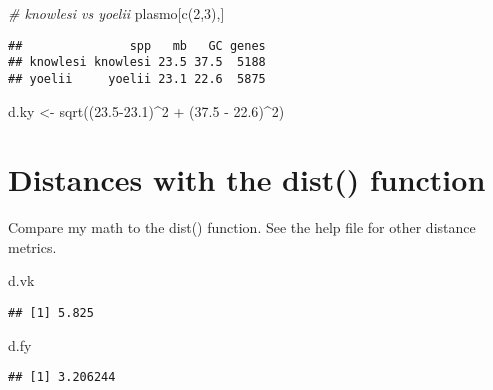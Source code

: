 \documentclass[
]{book}
\newenvironment{Shaded}{\begin{snugshade}}{\end{snugshade}}
\newcommand{\CommentTok}[1]{\textcolor[rgb]{0.56,0.35,0.01}{\textit{#1}}}
\newcommand{\DecValTok}[1]{\textcolor[rgb]{0.00,0.00,0.81}{#1}}
\newcommand{\FloatTok}[1]{\textcolor[rgb]{0.00,0.00,0.81}{#1}}
\newcommand{\FunctionTok}[1]{\textcolor[rgb]{0.00,0.00,0.00}{#1}}
\newcommand{\NormalTok}[1]{#1}
\newcommand{\OtherTok}[1]{\textcolor[rgb]{0.56,0.35,0.01}{#1}}
\newcommand{\SpecialCharTok}[1]{\textcolor[rgb]{0.00,0.00,0.00}{#1}}
\begin{document}
\begin{Shaded}
\begin{Highlighting}[]
\CommentTok{\# knowlesi vs yoelii}
\NormalTok{plasmo[}\FunctionTok{c}\NormalTok{(}\DecValTok{2}\NormalTok{,}\DecValTok{3}\NormalTok{),]}
\end{Highlighting}
\end{Shaded}

\begin{verbatim}
##               spp   mb   GC genes
## knowlesi knowlesi 23.5 37.5  5188
## yoelii     yoelii 23.1 22.6  5875
\end{verbatim}

\begin{Shaded}
\begin{Highlighting}[]
\NormalTok{d.ky }\OtherTok{\textless{}{-}} \FunctionTok{sqrt}\NormalTok{((}\FloatTok{23.5{-}23.1}\NormalTok{)}\SpecialCharTok{\^{}}\DecValTok{2} \SpecialCharTok{+}\NormalTok{ (}\FloatTok{37.5} \SpecialCharTok{{-}} \FloatTok{22.6}\NormalTok{)}\SpecialCharTok{\^{}}\DecValTok{2}\NormalTok{)}
\end{Highlighting}
\end{Shaded}

\hypertarget{distances-with-the-dist-function}{%
\section{Distances with the dist() function}\label{distances-with-the-dist-function}}

Compare my math to the dist() function. See the help file for other distance metrics.

\begin{Shaded}
\begin{Highlighting}[]
\NormalTok{d.vk}
\end{Highlighting}
\end{Shaded}

\begin{verbatim}
## [1] 5.825
\end{verbatim}

\begin{Shaded}
\begin{Highlighting}[]
\NormalTok{d.fy}
\end{Highlighting}
\end{Shaded}

\begin{verbatim}
## [1] 3.206244
\end{verbatim}
\end{document}
